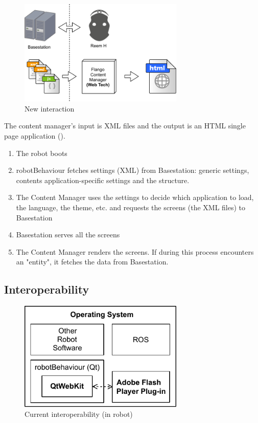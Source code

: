 \begin{figure}[htb]
    \label{fig:interaction-new}
    \centering
    \includegraphics[width=0.7\textwidth]{figures/interaction-new}
    \caption{New interaction}
\end{figure}

The content manager's input is \ac{XML} files and the output is an \ac{HTML} single page application ().

\begin{enumerate}
    \item The robot boots
    \item robotBehaviour fetches settings (\ac{XML}) from Basestation: generic settings, contents application-specific settings and the structure.
    \item The Content Manager uses the settings to decide which application to load, the language, the theme, etc. and requests the screens (the \ac{XML} files) to Basestation
    \item Basestation serves all the screens
    \item The Content Manager renders the screens. If during this process encounters an "entity", it fetches the data from Basestation.
\end{enumerate}


\subsection{Interoperability}
\begin{figure}[htb]
    \label{fig:interoperability-original}
    \centering
    \includegraphics[width=0.7\textwidth]{figures/interoperability-original}
    \caption{Current interoperability (in robot)}
\end{figure}

